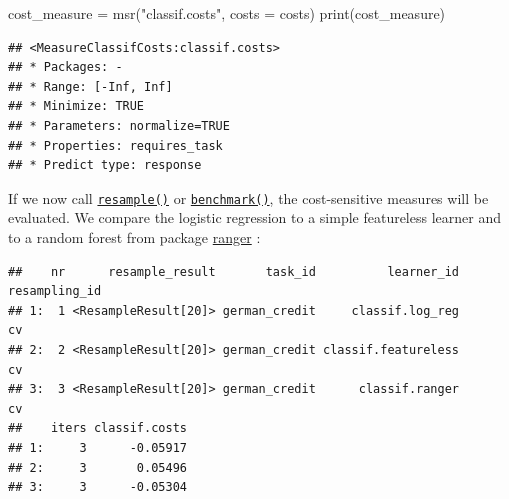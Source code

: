 \documentclass[
]{scrbook}
\newenvironment{Shaded}{\begin{snugshade}}{\end{snugshade}}
\newcommand{\AttributeTok}[1]{\textcolor[rgb]{0.77,0.63,0.00}{#1}}
\newcommand{\DecValTok}[1]{\textcolor[rgb]{0.00,0.00,0.81}{#1}}
\newcommand{\FunctionTok}[1]{\textcolor[rgb]{0.00,0.00,0.00}{#1}}
\newcommand{\NormalTok}[1]{#1}
\newcommand{\OtherTok}[1]{\textcolor[rgb]{0.56,0.35,0.01}{#1}}
\newcommand{\SpecialCharTok}[1]{\textcolor[rgb]{0.00,0.00,0.00}{#1}}
\newcommand{\StringTok}[1]{\textcolor[rgb]{0.31,0.60,0.02}{#1}}
\renewenvironment{Shaded} {\begin{snugshade}\small} {\end{snugshade}}
\begin{document}
\begin{Shaded}
\begin{Highlighting}[]
\NormalTok{cost\_measure }\OtherTok{=} \FunctionTok{msr}\NormalTok{(}\StringTok{"classif.costs"}\NormalTok{, }\AttributeTok{costs =}\NormalTok{ costs)}
\FunctionTok{print}\NormalTok{(cost\_measure)}
\end{Highlighting}
\end{Shaded}

\begin{verbatim}
## <MeasureClassifCosts:classif.costs>
## * Packages: -
## * Range: [-Inf, Inf]
## * Minimize: TRUE
## * Parameters: normalize=TRUE
## * Properties: requires_task
## * Predict type: response
\end{verbatim}

If we now call \href{https://mlr3.mlr-org.com/reference/resample.html}{\texttt{resample()}} or \href{https://mlr3.mlr-org.com/reference/benchmark.html}{\texttt{benchmark()}}, the cost-sensitive measures will be evaluated.
We compare the logistic regression to a simple featureless learner and to a random forest from package \href{https://cran.r-project.org/package=ranger}{ranger} :

\begin{Shaded}
\end{Shaded}

\begin{verbatim}
##    nr      resample_result       task_id          learner_id resampling_id
## 1:  1 <ResampleResult[20]> german_credit     classif.log_reg            cv
## 2:  2 <ResampleResult[20]> german_credit classif.featureless            cv
## 3:  3 <ResampleResult[20]> german_credit      classif.ranger            cv
##    iters classif.costs
## 1:     3      -0.05917
## 2:     3       0.05496
## 3:     3      -0.05304
\end{verbatim}
\end{document}
